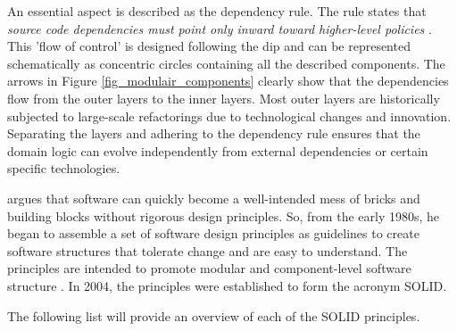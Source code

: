 An essential aspect is described as the dependency rule. The rule states that
\textit{source code dependencies must point only inward toward higher-level policies}
\parencite[206]{r_c_martin_clean_2018}. This ’flow of control’ is designed following the
\gls{dip} and can be represented schematically as concentric circles containing all the
described components. The arrows in Figure \ref{fig_modulair_components} clearly show that
the dependencies flow from the outer layers to the inner layers. Most outer layers are
historically subjected to large-scale refactorings due to technological changes and
innovation. Separating the layers and adhering to the dependency rule ensures that the
domain logic can evolve independently from external dependencies or certain specific
technologies.

\textcite[78]{r_c_martin_clean_2018} argues that software can quickly become a
well-intended mess of bricks and building blocks without rigorous design principles. So,
from the early 1980s, he began to assemble a set of software design principles as
guidelines to create software structures that tolerate change and are easy to understand.
The principles are intended to promote modular and component-level software structure
\parencite[79]{r_c_martin_clean_2018}. In 2004, the principles were established to form
the acronym SOLID. 

The following list will provide an overview of each of the SOLID principles.

